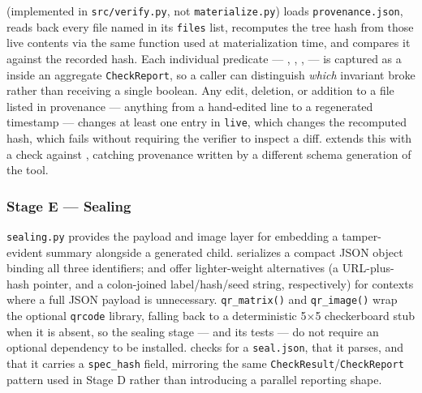\documentclass[
]{article}
\begin{document}
 (implemented in
\texttt{src/verify.py}, not \texttt{materialize.py}) loads
\texttt{provenance.json}, reads back every file named in its
\texttt{files} list, recomputes the tree hash from those live contents
via the same  function used at
materialization time, and compares it against the recorded hash. Each
individual predicate --- ,
, ,
 --- is captured as a
 inside an aggregate
\texttt{CheckReport}, so a caller can distinguish \emph{which} invariant
broke rather than receiving a single boolean. Any edit, deletion, or
addition to a file listed in provenance --- anything from a hand-edited
line to a regenerated timestamp --- changes at least one entry in
\texttt{live}, which changes the recomputed hash, which fails
 without requiring the verifier to inspect a
diff.  extends this with a
 check against
, catching provenance
written by a different schema generation of the tool.

\subsubsection{Stage E --- Sealing}\label{stage-e-sealing}

\texttt{sealing.py} provides the payload and image layer for embedding a
tamper-evident summary alongside a generated child.
 serializes a
compact JSON object binding all three identifiers;
 and 
offer lighter-weight alternatives (a URL-plus-hash pointer, and a
colon-joined label/hash/seed string, respectively) for contexts where a
full JSON payload is unnecessary. \texttt{qr\_matrix()} and
\texttt{qr\_image()} wrap the optional \texttt{qrcode} library, falling
back to a deterministic 5\texorpdfstring{\ensuremath{\times}}{x}5 checkerboard stub when it is absent, so the
sealing stage --- and its tests --- do not require an optional
dependency to be installed.  checks
for a \texttt{seal.json}, that it parses, and that it carries a
\texttt{spec\_hash} field, mirroring the same
\texttt{CheckResult}/\texttt{CheckReport} pattern used in Stage D rather
than introducing a parallel reporting shape.
\end{document}
